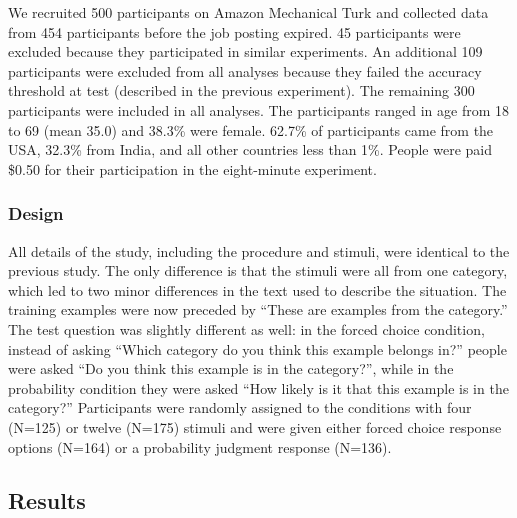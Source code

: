 \documentclass[doc,apacite]{apa6}
\begin{document}
We recruited 500 participants on Amazon Mechanical Turk and collected data from 454 participants before the job posting expired. 45 participants were excluded because they participated in similar experiments. An additional 109 participants were excluded from all analyses because they failed the accuracy threshold at test (described in the previous experiment). The remaining 300 participants were included in all analyses. The participants ranged in age from 18 to 69 (mean 35.0) and 38.3\% were female. 62.7\% of participants came from the USA, 32.3\% from India, and all other countries less than 1\%. 
People were paid \$0.50 for their participation in the eight-minute experiment.

\subsubsection{Design}

All details of the study, including the procedure and stimuli, were identical to the previous study. The only difference is that the stimuli were all from one category, which led to two minor differences in the text used to describe the situation. The training examples were now preceded by ``These are examples from the category.'' The test question was slightly different as well: in the {\sc forced choice} condition, instead of asking ``Which category do you think this example belongs in?'' people were asked ``Do you think this example is in the category?'', while in the {\sc probability} condition they were asked ``How likely is it that this example is in the category?''
Participants were randomly assigned to the conditions with {\sc four} (N=125) or {\sc twelve} (N=175) stimuli and were given either {\sc forced choice} response options (N=164) or a {\sc probability} judgment response (N=136).


\subsection{Results}
\end{document}
